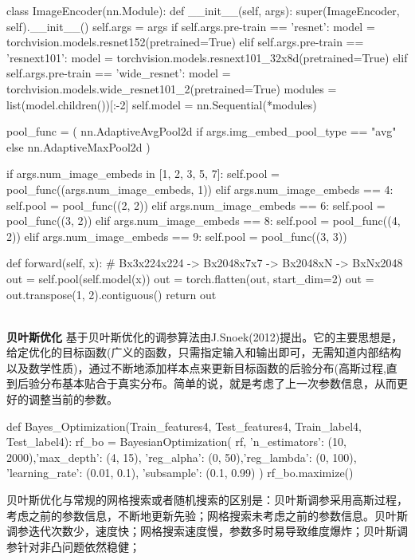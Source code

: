 \begin{python} 
    class ImageEncoder(nn.Module):
    def __init__(self, args):
        super(ImageEncoder, self).__init__()
        self.args = args
        if self.args.pre-train == 'resnet':
            model = torchvision.models.resnet152(pretrained=True)
        elif self.args.pre-train == 'resnext101':
            model = torchvision.models.resnext101_32x8d(pretrained=True)
        elif self.args.pre-train == 'wide_resnet':
            model = torchvision.models.wide_resnet101_2(pretrained=True)
        modules = list(model.children())[:-2]
        self.model = nn.Sequential(*modules)

        pool_func = (
            nn.AdaptiveAvgPool2d
            if args.img_embed_pool_type == "avg"
            else nn.AdaptiveMaxPool2d
        )

        if args.num_image_embeds in [1, 2, 3, 5, 7]:
            self.pool = pool_func((args.num_image_embeds, 1))
        elif args.num_image_embeds == 4:
            self.pool = pool_func((2, 2))
        elif args.num_image_embeds == 6:
            self.pool = pool_func((3, 2))
        elif args.num_image_embeds == 8:
            self.pool = pool_func((4, 2))
        elif args.num_image_embeds == 9:
            self.pool = pool_func((3, 3))

    def forward(self, x):
        # Bx3x224x224 -> Bx2048x7x7 -> Bx2048xN -> BxNx2048
        out = self.pool(self.model(x))
        out = torch.flatten(out, start_dim=2)
        out = out.transpose(1, 2).contiguous()
        return out
\end{python}\\

\noindent \textbf{贝叶斯优化}
\noindent 基于贝叶斯优化的调参算法由J.Snoek(2012)提出。它的主要思想是，给定优化的目标函数(广义的函数，只需指定输入和输出即可，无需知道内部结构以及数学性质)，通过不断地添加样本点来更新目标函数的后验分布(高斯过程,直到后验分布基本贴合于真实分布。简单的说，就是考虑了上一次参数信息，从而更好的调整当前的参数。\\
\begin{python} 
def Bayes_Optimization(Train_features4, Test_features4,                               Train_label4, Test_label4):
    rf_bo = BayesianOptimization(
        rf,
        {'n_estimators': (10, 2000),'max_depth': (4, 15),
         'reg_alpha': (0, 50),'reg_lambda': (0, 100),
         'learning_rate': (0.01, 0.1),
         'subsample': (0.1, 0.99)
         }
    )
    rf_bo.maximize()
\end{python}
\noindent 贝叶斯优化与常规的网格搜索或者随机搜索的区别是：贝叶斯调参采用高斯过程，考虑之前的参数信息，不断地更新先验；网格搜索未考虑之前的参数信息。贝叶斯调参迭代次数少，速度快；网格搜索速度慢，参数多时易导致维度爆炸；贝叶斯调参针对非凸问题依然稳健；\\

